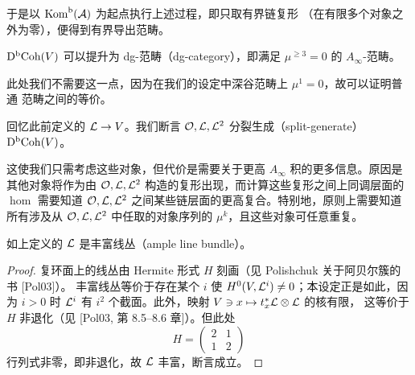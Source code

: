 
于是以 $\mathrm{Kom}^{\mathrm{b}}(\mathcal{A})$ 为起点执行上述过程，即只取有界链复形
（在有限多个对象之外为零），便得到有界导出范畴。

\begin{claim}\label{claim:dg-enhance}
$\mathrm{D}^{\mathrm{b}}\mathrm{Coh}(V)$ 可以提升为 dg-范畴（dg-category），即满足 $\mu^{\ge3}=0$ 的
$A_\infty$-范畴。
\end{claim}


此处我们不需要这一点，因为在我们的设定中深谷范畴上 $\mu^1=0$，故可以证明普通
范畴之间的等价。

\begin{claim}\label{claim:split-generate}
回忆此前定义的 $\mathcal{L}\to V$。我们断言 $\mathcal{O},\mathcal{L},\mathcal{L}^2$ 分裂生成（split-generate）
$\mathrm{D}^{\mathrm{b}}\mathrm{Coh}(V)$。
\end{claim}

\begin{remark}\label{rem:higher-products}
这使我们只需考虑这些对象，但代价是需要关于更高 $A_\infty$ 积的更多信息。原因是
其他对象将作为由 $\mathcal{O},\mathcal{L},\mathcal{L}^2$ 构造的复形出现，而计算这些复形之间上同调层面的
$\hom$ 需要知道 $\mathcal{O},\mathcal{L},\mathcal{L}^2$ 之间某些链层面的更高复合。特别地，原则上需要知道
所有涉及从 $\mathcal{O},\mathcal{L},\mathcal{L}^2$ 中任取的对象序列的 $\mu^k$，且这些对象可任意重复。
\end{remark}

\begin{claim}\label{claim:ample}
如上定义的 $\mathcal{L}$ 是丰富线丛（ample line bundle）。
\end{claim}

\begin{proof}
复环面上的线丛由 Hermite 形式 $H$ 刻画（见 Polishchuk 关于阿贝尔簇的书 [Pol03]）。
丰富线丛等价于存在某个 $i$ 使 $H^0(V,\mathcal{L}^i)\ne0$；本设定正是如此，因为 $i>0$ 时
$\mathcal{L}^i$ 有 $i^2$ 个截面。此外，映射 $V\ni x\mapsto t_x^*\mathcal{L}\otimes\mathcal{L}$ 的核有限，
这等价于 $H$ 非退化（见 [Pol03, 第 8.5--8.6 章]）。但此处
\[
H=\begin{pmatrix}2&1\\1&2\end{pmatrix}
\]
行列式非零，即非退化，故 $\mathcal{L}$ 丰富，断言成立。
\end{proof}

